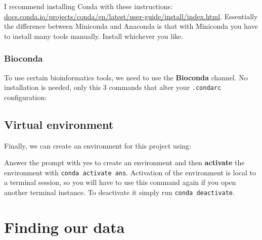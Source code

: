 I recommend installing Conda with these instructions:
\url{docs.conda.io/projects/conda/en/latest/user-guide/install/index.html}.
Essentially the difference between Miniconda and Anaconda is that with
Miniconda you have to install many tools manually. Install whichever you
like.

\hypertarget{bioconda}{%
\subsubsection{Bioconda}\label{bioconda}}

To use certain bioinformatics tools, we need to use the
\textbf{Bioconda} channel. No installation is needed, only this 3
commands that alter your \texttt{.condarc} configuration:

\begin{Shaded}
\begin{Highlighting}[]
\end{Highlighting}
\end{Shaded}

\hypertarget{virtual-environment}{%
\subsection{Virtual environment}\label{virtual-environment}}

Finally, we can create an environment for this project using:

\begin{Shaded}
\begin{Highlighting}[]
\end{Highlighting}
\end{Shaded}

Answer the prompt with yes to create an environment and then
\textbf{activate} the environment with \texttt{conda\ activate\ ans}.
Activation of the environment is local to a terminal session, so you
will have to use this command again if you open another terminal
instance. To deactivate it simply run \texttt{conda\ deactivate}.

\hypertarget{finding-our-data}{%
\section{Finding our data}\label{finding-our-data}}

